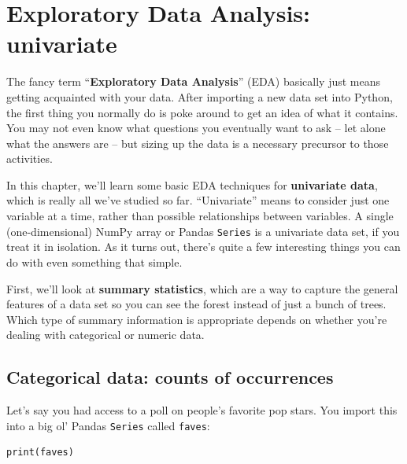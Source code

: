 
\chapter{Exploratory Data Analysis: univariate}
\label{ch:edaUnivariate}


The fancy term ``\textbf{Exploratory Data Analysis}'' (EDA) basically just
means getting acquainted with your data. After importing a new data set into
Python, the first thing you normally do is poke around to get an idea of what
it contains. You may not even know what questions you eventually want to ask --
let alone what the answers are -- but sizing up the data is a necessary
precursor to those activities.


In this chapter, we'll learn some basic EDA techniques for \textbf{univariate
data}, which is really all we've studied so far. ``Univariate'' means to
consider just one variable at a time, rather than possible relationships
between variables. A single (one-dimensional) NumPy array or Pandas
\texttt{Series} is a univariate data set, if you treat it in isolation. As it
turns out, there's quite a few interesting things you can do with even
something that simple.



First, we'll look at \textbf{summary statistics}, which are a way to capture
the general features of a data set so you can see the forest instead of just a
bunch of trees. Which type of summary information is appropriate depends on
whether you're dealing with categorical or numeric data.

\section{Categorical data: counts of occurrences}

\label{categoricalDataValueCounts}


Let's say you had access to a poll on people's favorite pop stars. You import
this into a big ol' Pandas \texttt{Series} called \texttt{faves}:

\begin{Verbatim}[fontsize=\scriptsize,samepage=true,frame=single,framesep=3mm]
print(faves)
\end{Verbatim}

